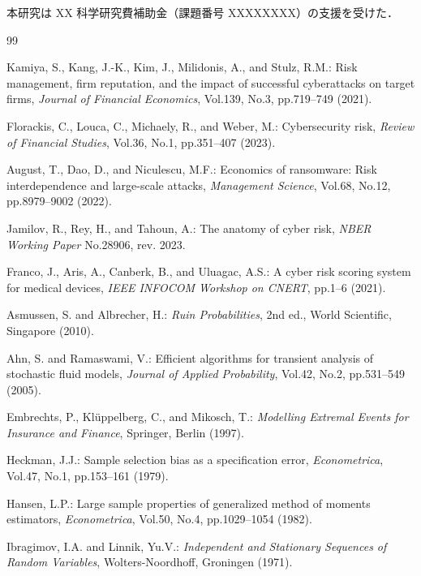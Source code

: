 \documentclass{ipsjlike}
\begin{document}
本研究は XX 科学研究費補助金（課題番号 XXXXXXXX）の支援を受けた．

\begin{thebibliography}{99}

Kamiya, S., Kang, J.-K., Kim, J., Milidonis, A., and Stulz, R.M.:
Risk management, firm reputation, and the impact of successful cyberattacks on target firms,
\textit{Journal of Financial Economics}, Vol.139, No.3, pp.719--749 (2021).

Florackis, C., Louca, C., Michaely, R., and Weber, M.:
Cybersecurity risk,
\textit{Review of Financial Studies}, Vol.36, No.1, pp.351--407 (2023).

August, T., Dao, D., and Niculescu, M.F.:
Economics of ransomware: Risk interdependence and large-scale attacks,
\textit{Management Science}, Vol.68, No.12, pp.8979--9002 (2022).

Jamilov, R., Rey, H., and Tahoun, A.:
The anatomy of cyber risk,
\textit{NBER Working Paper} No.28906, rev. 2023.

Franco, J., Aris, A., Canberk, B., and Uluagac, A.S.:
A cyber risk scoring system for medical devices,
\textit{IEEE INFOCOM Workshop on CNERT}, pp.1--6 (2021).

Asmussen, S. and Albrecher, H.:
\textit{Ruin Probabilities}, 2nd ed.,
World Scientific, Singapore (2010).

Ahn, S. and Ramaswami, V.:
Efficient algorithms for transient analysis of stochastic fluid models,
\textit{Journal of Applied Probability}, Vol.42, No.2, pp.531--549 (2005).

Embrechts, P., Kl\"{u}ppelberg, C., and Mikosch, T.:
\textit{Modelling Extremal Events for Insurance and Finance},
Springer, Berlin (1997).

Heckman, J.J.:
Sample selection bias as a specification error,
\textit{Econometrica}, Vol.47, No.1, pp.153--161 (1979).

Hansen, L.P.:
Large sample properties of generalized method of moments estimators,
\textit{Econometrica}, Vol.50, No.4, pp.1029--1054 (1982).

Ibragimov, I.A. and Linnik, Yu.V.:
\textit{Independent and Stationary Sequences of Random Variables},
Wolters-Noordhoff, Groningen (1971).


\end{thebibliography}
\end{document}
